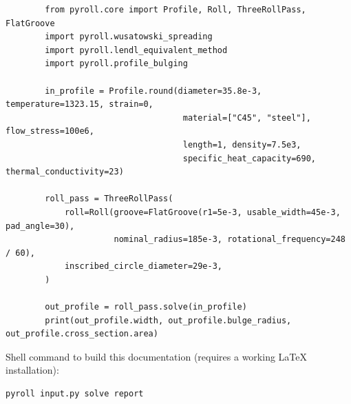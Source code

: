 \documentclass[11pt]{PyRollDocs}
\begin{document}
    \begin{verbatim}
        from pyroll.core import Profile, Roll, ThreeRollPass, FlatGroove
        import pyroll.wusatowski_spreading
        import pyroll.lendl_equivalent_method
        import pyroll.profile_bulging

        in_profile = Profile.round(diameter=35.8e-3, temperature=1323.15, strain=0,
                                    material=["C45", "steel"], flow_stress=100e6,
                                    length=1, density=7.5e3,
                                    specific_heat_capacity=690, thermal_conductivity=23)

        roll_pass = ThreeRollPass(
            roll=Roll(groove=FlatGroove(r1=5e-3, usable_width=45e-3, pad_angle=30),
                      nominal_radius=185e-3, rotational_frequency=248 / 60),
            inscribed_circle_diameter=29e-3,
        )

        out_profile = roll_pass.solve(in_profile)
        print(out_profile.width, out_profile.bulge_radius, out_profile.cross_section.area)
    \end{verbatim}

    Shell command to build this documentation (requires a working LaTeX installation):

    \begin{verbatim}
pyroll input.py solve report
    \end{verbatim}

    \printbibliography
\end{document}
